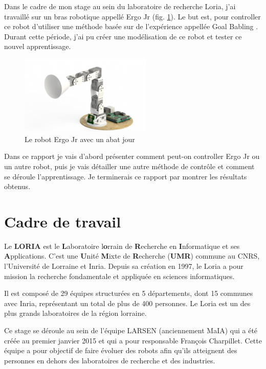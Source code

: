 \documentclass[11pt,french]{report}
\begin{document}
Dans le cadre de mon stage au sein du laboratoire de recherche Loria, j'ai travaillé sur un bras robotique appellé Ergo Jr (fig. \ref{fig:ErgoJr}).
Le but est, pour controller ce robot d'utiliser une méthode basée sur de l'expérience appellée Goal Babling \cite{GoalBabling}.
Durant cette période, j'ai pu créer une modélisation de ce robot et tester ce nouvel apprentissage.

\phantom{INVISIBLE LINE}

\begin{figure}
    \centering
    \includegraphics[width=178pt]{Ergo_Jr_abat_jour} 
    \caption{Le robot Ergo Jr avec un abat jour}
    \label{fig:ErgoJr}
\end{figure}

Dans ce rapport je vais d'abord présenter comment peut-on controller Ergo Jr ou un autre robot, puis je vais détailler une autre méthode de contrôle et comment se déroule l'apprentissage.
Je terminerais ce rapport par montrer les résultats obtenus.

\chapter{Cadre de travail}

Le \textbf{LORIA} est le \textbf{L}aboratoire l\textbf{o}rrain de \textbf{R}echerche en \textbf{I}nformatique et ses \textbf{A}pplications.
C'est une \textbf{U}nité \textbf{M}ixte de \textbf{R}echerche (\textbf{UMR}) commune au CNRS, l'Université de Lorraine et Inria.
Depuis sa création en 1997, le Loria a pour mission la recherche fondamentale et appliquée en sciences informatiques.

Il est composé de 29 équipes structurées en 5 départements, dont 15 communes avec Inria, représentant un total de plus de 400 personnes.
Le Loria est un des plus grands laboratoires de la région lorraine.

\phantom{INVISIBLE LINE}

Ce stage se déroule au sein de l’équipe LARSEN (anciennement MaIA) qui a été créée au premier janvier 2015 et qui a pour responsable François Charpillet.
Cette équipe a pour objectif de faire évoluer des robots afin qu'ils atteignent des personnes en dehors des laboratoires de recherche et des industries.
\end{document}
